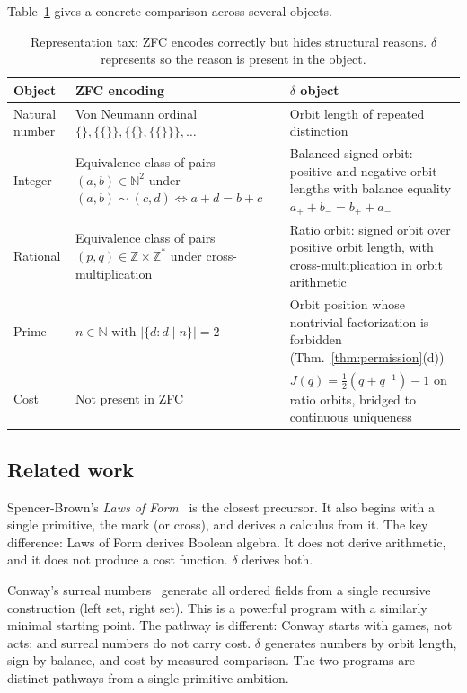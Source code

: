 \documentclass[11pt,a4paper]{article}
\theoremstyle{definition}
\theoremstyle{remark}
\begin{document}
Table~\ref{tab:reptax} gives a concrete comparison across several objects.

\begin{table}[ht]
\centering\small
\begin{tabular}{lp{4.8cm}p{4.8cm}}
\toprule
\textbf{Object} & \textbf{ZFC encoding} & \textbf{$\delta$ object} \\
\midrule
Natural number &
  Von Neumann ordinal $\{\}, \{\{\}\}, \{\{\},\{\{\}\}\}, \ldots$  &
  Orbit length of repeated distinction \\
Integer &
  Equivalence class of pairs $(a,b) \in \mathbb{N}^2$ under
  $(a,b)\sim(c,d) \Leftrightarrow a+d=b+c$ &
  Balanced signed orbit: positive and negative orbit lengths with
  balance equality $a_+ + b_- = b_+ + a_-$ \\
Rational &
  Equivalence class of pairs $(p,q) \in \mathbb{Z}\times\mathbb{Z}^*$
  under cross-multiplication &
  Ratio orbit: signed orbit over positive orbit length, with
  cross-multiplication in orbit arithmetic \\
Prime &
  $n\in\mathbb{N}$ with $|\{d : d\mid n\}|=2$ &
  Orbit position whose nontrivial factorization is forbidden
  (Thm.~\ref{thm:permission}(d)) \\
Cost &
  Not present in ZFC &
  $J(q)=\tfrac{1}{2}(q+q^{-1})-1$ on ratio orbits,
  bridged to continuous uniqueness \\
\bottomrule
\end{tabular}
\caption{Representation tax: ZFC encodes correctly but hides structural
reasons. $\delta$ represents so the reason is present in the object.}
\label{tab:reptax}
\end{table}

\subsection{Related work}

Spencer-Brown's \emph{Laws of Form}~\cite{SpencerBrown1969} is the closest
precursor. It also begins with a single primitive, the mark (or cross), and
derives a calculus from it. The key difference: Laws of Form derives Boolean
algebra. It does not derive arithmetic, and it does not produce a cost
function. $\delta$ derives both.

Conway's surreal numbers~\cite{Conway1976} generate all ordered fields from a
single recursive construction (left set, right set). This is a powerful program
with a similarly minimal starting point. The pathway is different: Conway
starts with games, not acts; and surreal numbers do not carry cost. $\delta$
generates numbers by orbit length, sign by balance, and cost by measured
comparison. The two programs are distinct pathways from a single-primitive
ambition.
\end{document}
